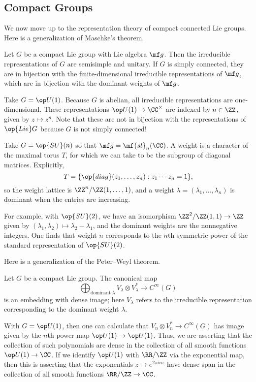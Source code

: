 \documentclass[../notes.tex]{subfiles}
\begin{document}
\subsection{Compact Groups}
We now move up to the representation theory of compact connected Lie groups. Here is a generalization of Maschke's theorem.
\begin{theorem}
	Let $G$ be a compact Lie group with Lie algebra $\mf g$. Then the irreducible representations of $G$ are semisimple and unitary. If $G$ is simply connected, they are in bijection with the finite-dimensional irreducible representations of $\mf g$, which are in bijection with the dominant weights of $\mf g$.
\end{theorem}
\begin{example}
	Take $G=\op U(1)$. Because $G$ is abelian, all irreducible representations are one-dimensional. These representations $\op U(1)\to\CC^\times$ are indexed by $n\in\ZZ$, given by $z\mapsto z^n$. Note that these are not in bijection with the representations of $\op{Lie}G$ because $G$ is not simply connected!
\end{example}
\begin{example}
	Take $G=\op{SU}(n)$ so that $\mf g=\mf{sl}_n(\CC)$. A weight is a character of the maximal torus $T$, for which we can take to be the subgroup of diagonal matrices. Explicitly,
	\[T=\{\op{diag}(z_1,\ldots,z_n):z_1\cdots z_n=1\},\]
	so the weight lattice is $\ZZ^n/\ZZ(1,\ldots,1)$, and a weight $\lambda=(\lambda_1,\ldots,\lambda_n)$ is dominant when the entries are increasing.
\end{example}
\begin{example}
	For example, with $\op{SU}(2)$, we have an isomorphism $\ZZ^2/\ZZ(1,1)\to\ZZ$ given by $(\lambda_1,\lambda_2)\mapsto\lambda_2-\lambda_1$, and the dominant weights are the nonnegative integers. One finds that weight $n$ corresponds to the $n$th symmetric power of the standard representation of $\op{SU}(2)$.
\end{example}
Here is a generalization of the Peter--Weyl theorem.
\begin{theorem}
	Let $G$ be a compact Lie group. The canonical map
	\[\bigoplus_{\text{dominant }\lambda}V_\lambda\otimes V_\lambda^*\to C^\infty(G)\]
	is an embedding with dense image; here $V_\lambda$ refers to the irreducible representation corresponding to the dominant weight $\lambda$.
\end{theorem}
\begin{example}
	With $G=\op U(1)$, then one can calculate that $V_n\otimes V_n^*\to C^\infty(G)$ has image given by the $n$th power map $\op U(1)\to\op U(1)$. Thus, we are asserting that the collection of such polynomials are dense in the collection of all smooth functions $\op U(1)\to\CC$. If we identify $\op U(1)$ with $\RR/\ZZ$ via the exponential map, then this is asserting that the exponentials $z\mapsto e^{2\pi inz}$ have dense span in the collection of all smooth functions $\RR/\ZZ\to\CC$.
\end{example}
\end{document}
